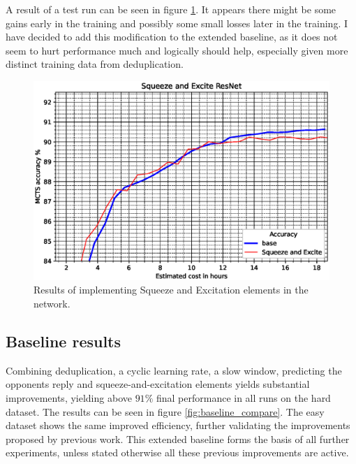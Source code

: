 \documentclass[12pt,onecolumn,oneside,titlepage]{article}
\begin{document}
A result of a test run can be seen in figure \ref{fig:sqnet}. 
It appears there might be some gains early in the training and possibly some small losses later in the training. I have decided to add this modification to the extended baseline, as it does not seem to hurt performance much and 
logically should help, especially given more distinct training data from deduplication.


\begin{figure}[H]
\centering
\includegraphics[clip,width=\columnwidth]{sqnet}
\caption{Results of implementing Squeeze and Excitation elements in the network.}
\label{fig:sqnet}
\end{figure}


\subsection{Baseline results}

Combining deduplication, a cyclic learning rate, a slow window, predicting the opponents reply and squeeze-and-excitation elements yields substantial improvements, yielding above $91\%$ final performance in all runs on the hard dataset. The results can be seen in figure \ref{fig:baseline_compare}.
The easy dataset shows the same improved efficiency, further validating the improvements proposed by previous work.
This extended baseline forms the basis of all further experiments, unless stated otherwise all these previous improvements are active.
\end{document}
